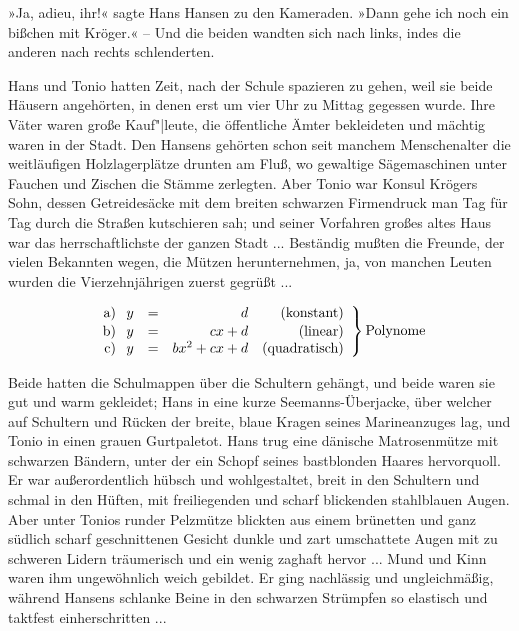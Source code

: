 \documentclass[twoside,DIV=calc,BCOR=5mm,12pt,ngerman,twocolumn]{scrartcl}
\begin{document}
»Ja, adieu, ihr!« sagte Hans Hansen zu den Kameraden. »Dann gehe ich
noch ein bißchen mit Kröger.« -- Und die beiden wandten sich nach links,
indes die anderen nach rechts schlenderten.

Hans und Tonio hatten Zeit, nach der Schule spazieren zu gehen, weil sie
beide Häusern angehörten, in denen erst um vier Uhr zu Mittag gegessen
wurde. Ihre Väter waren große Kauf"|leute, die öffentliche Ämter
bekleideten und mächtig waren in der Stadt. Den Hansens gehörten schon
seit manchem Menschenalter die weitläufigen Holzlagerplätze drunten am
Fluß, wo gewaltige Sägemaschinen unter Fauchen und Zischen die Stämme
zerlegten. Aber Tonio war Konsul Krögers Sohn, dessen Getreidesäcke mit
dem breiten schwarzen Firmendruck man Tag für Tag durch die Straßen
kutschieren sah; und seiner Vorfahren großes altes Haus war das
herrschaftlichste der ganzen Stadt ... Beständig mußten die Freunde, der
vielen Bekannten wegen, die Mützen herunternehmen, ja, von manchen
Leuten wurden die Vierzehnjährigen zuerst gegrüßt ...

\setlength\arraycolsep{1.4pt}
\begin{equation}
    \left.
    \begin{array}{r@{\hspace{.75em}}ccrr}
        \textrm{a}) & y & = & d                     & \textrm{(konstant)}   \\[1pt]
        \textrm{b}) & y & = & cx+d                     & \textrm{(linear)}   \\
        \textrm{c}) & y & = & bx^2+cx+d                     & \textrm{(quadratisch)}   \\
    \end{array}
    \right\} \textrm{Polynome}
\end{equation}

Beide hatten die Schulmappen über die Schultern gehängt, und beide waren
sie gut und warm gekleidet; Hans in eine kurze Seemanns-Überjacke, über
welcher auf Schultern und Rücken der breite, blaue Kragen seines
Marineanzuges lag, und Tonio in einen grauen Gurtpaletot. Hans trug eine
dänische Matrosenmütze mit schwarzen Bändern, unter der ein Schopf
seines bastblonden Haares hervorquoll. Er war außerordentlich hübsch und
wohlgestaltet, breit in den Schultern und schmal in den Hüften, mit
freiliegenden und scharf blickenden stahlblauen Augen. Aber unter Tonios
runder Pelzmütze blickten aus einem brünetten und ganz südlich scharf
geschnittenen Gesicht dunkle und zart umschattete Augen mit zu schweren
Lidern träumerisch und ein wenig zaghaft hervor ... Mund und Kinn waren
ihm ungewöhnlich weich gebildet. Er ging nachlässig und ungleichmäßig,
während Hansens schlanke Beine in den schwarzen Strümpfen so elastisch
und taktfest einherschritten ...
\end{document}

